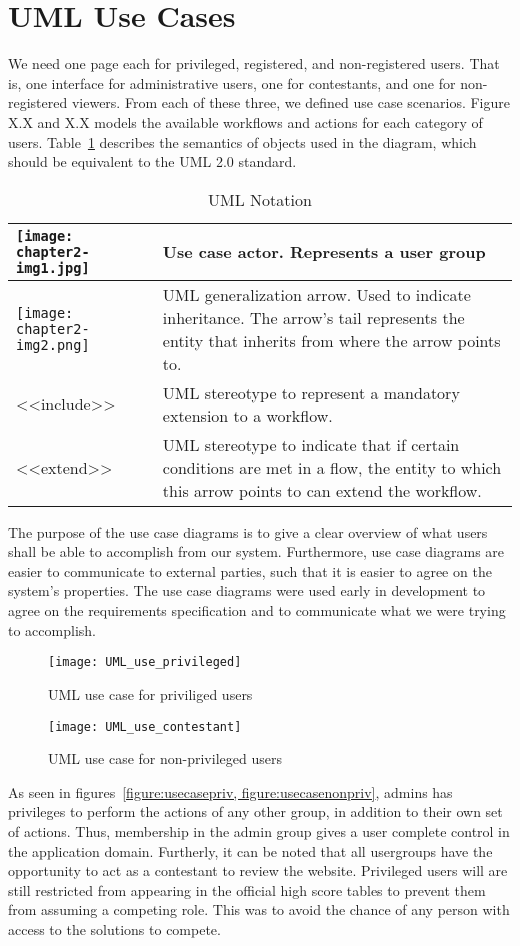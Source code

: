 \section{UML Use Cases}
We need one page each for privileged, registered, and non-registered
users. That is, one interface for administrative users, one for
contestants, and one for non-registered viewers. From each of these
three, we defined use case scenarios. Figure X.X and X.X models the
available workflows and actions for each category of users.
Table~\ref{table:uml-notation} describes the semantics of objects used in the
diagram, which should be equivalent to the UML 2.0 standard.
\begin{longtable}{|m{}|m{}|}
\caption{UML Notation} \label{table:uml-notation} \\
\hline
	\texttt{[image: chapter2-img1.jpg]}  &
Use case actor. Represents a user group\\\hline
	\texttt{[image: chapter2-img2.png]}  &
UML generalization arrow. Used to indicate inheritance. The
arrow's tail represents the entity that
inherits from where the arrow points to.\\\hline
{\textless}{\textless}include{\textgreater}{\textgreater} &
UML stereotype to represent a mandatory extension to a
workflow.\\\hline
{\textless}{\textless}extend{\textgreater}{\textgreater} &
UML stereotype to indicate that if certain conditions are met in a flow,
the entity to which this arrow points to can extend the
workflow.\\\hline
\end{longtable}

The purpose of the use case diagrams is to give a clear overview of what
users shall be able to accomplish from our system. Furthermore, use
case diagrams are easier to communicate to external parties, such that
it is easier to agree on the system's properties. The
use case diagrams were used early in development to agree on the
requirements specification and to communicate what we
were trying to accomplish.

\begin{figure}[h!]
    \texttt{[image: UML\_use\_privileged]}
    \caption{UML use case for priviliged users} \label{figure:usecasepriv}
\end{figure}

\begin{figure}[h!]
    \texttt{[image: UML\_use\_contestant]}
    \caption{UML use case for non-privileged users} \label{figure:usecasenonpriv}
\end{figure}
As seen in figures~\cref{figure:usecasepriv, figure:usecasenonpriv}, admins
has privileges to perform the actions of any other group, in addition to
their own set of actions. Thus, membership in the admin group gives a user
complete control in the application domain. Furtherly, it can be noted that
all usergroups have the opportunity to act as a contestant to review the
website.  Privileged users will are still restricted from appearing in the
official high score tables to prevent them from assuming a competing role.
This was to avoid the chance of any person with access to the solutions to
compete.
